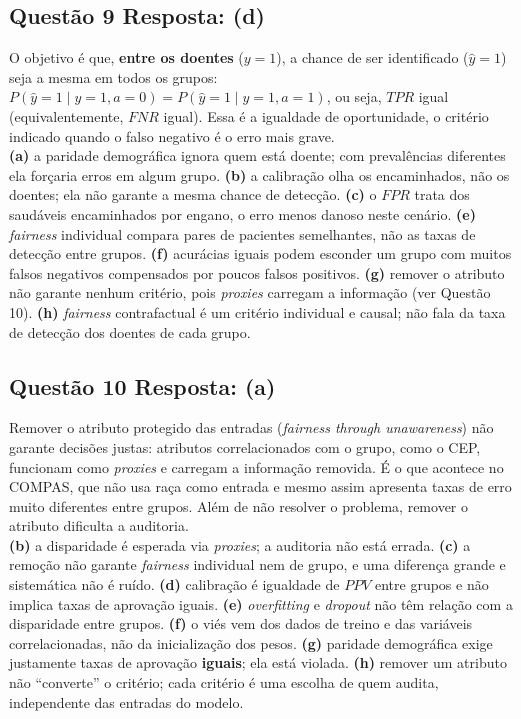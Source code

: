 \documentclass[11pt,a4paper]{article}
\begin{document}
\subsection*{Questão 9 \textemdash{} Resposta: (d)}
O objetivo é que, \textbf{entre os doentes} ($y = 1$), a chance de ser identificado ($\hat{y} = 1$) seja a mesma em todos os grupos: $P(\hat{y}{=}1 \mid y{=}1, a{=}0) = P(\hat{y}{=}1 \mid y{=}1, a{=}1)$, ou seja, $TPR$ igual (equivalentemente, $FNR$ igual). Essa é a igualdade de oportunidade, o critério indicado quando o falso negativo é o erro mais grave.\\
\textbf{(a)} a paridade demográfica ignora quem está doente; com prevalências diferentes ela forçaria erros em algum grupo.
\textbf{(b)} a calibração olha os encaminhados, não os doentes; ela não garante a mesma chance de detecção.
\textbf{(c)} o $FPR$ trata dos saudáveis encaminhados por engano, o erro menos danoso neste cenário.
\textbf{(e)} \textit{fairness} individual compara pares de pacientes semelhantes, não as taxas de detecção entre grupos.
\textbf{(f)} acurácias iguais podem esconder um grupo com muitos falsos negativos compensados por poucos falsos positivos.
\textbf{(g)} remover o atributo não garante nenhum critério, pois \textit{proxies} carregam a informação (ver Questão 10).
\textbf{(h)} \textit{fairness} contrafactual é um critério individual e causal; não fala da taxa de detecção dos doentes de cada grupo.

\subsection*{Questão 10 \textemdash{} Resposta: (a)}
Remover o atributo protegido das entradas (\textit{fairness through unawareness}) não garante decisões justas: atributos correlacionados com o grupo, como o CEP, funcionam como \textit{proxies} e carregam a informação removida. É o que acontece no COMPAS, que não usa raça como entrada e mesmo assim apresenta taxas de erro muito diferentes entre grupos. Além de não resolver o problema, remover o atributo dificulta a auditoria.\\
\textbf{(b)} a disparidade é esperada via \textit{proxies}; a auditoria não está errada.
\textbf{(c)} a remoção não garante \textit{fairness} individual nem de grupo, e uma diferença grande e sistemática não é ruído.
\textbf{(d)} calibração é igualdade de $PPV$ entre grupos e não implica taxas de aprovação iguais.
\textbf{(e)} \textit{overfitting} e \textit{dropout} não têm relação com a disparidade entre grupos.
\textbf{(f)} o viés vem dos dados de treino e das variáveis correlacionadas, não da inicialização dos pesos.
\textbf{(g)} paridade demográfica exige justamente taxas de aprovação \textbf{iguais}; ela está violada.
\textbf{(h)} remover um atributo não ``converte'' o critério; cada critério é uma escolha de quem audita, independente das entradas do modelo.
\end{document}
